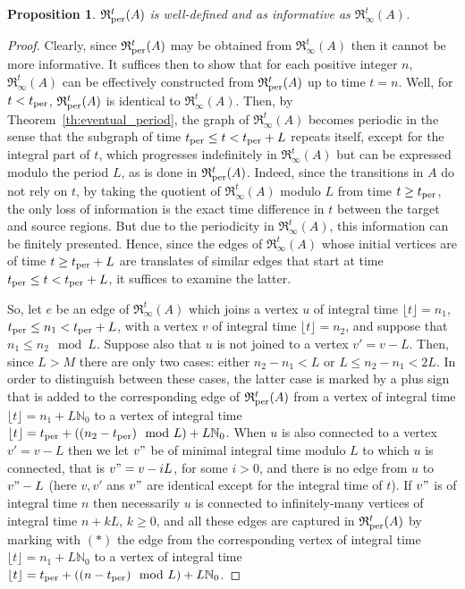 \documentclass[11pt]{amsart}
\newtheorem{proposition}[theorem]{Proposition}
\theoremstyle{definition}
\newcommand{\IARRR}{\mathfrak{R}_{\infty}^{t}}
\newcommand{\PARRR}{\mathfrak{R}_\textnormal{per}^{t}}
\newcommand{\ZNaturals}{\mathbb{N}_0}
\begin{document}
\begin{proposition}
	\label{prop:well_def}
	$\PARRR(A)$ is well-defined and as informative as $\IARRR(A)$.
\end{proposition}
\begin{proof}
	Clearly, since $\PARRR(A)$ may be obtained from $\IARRR(A)$ then it cannot be more informative.
	It suffices then to show that for each positive integer $n$, $\IARRR(A)$ can be effectively constructed from $\PARRR(A)$ up to time $t=n$.
	Well, for $t < t_\textnormal{per}$, $\PARRR(A)$ is identical to $\IARRR(A)$.
	Then, by Theorem~\ref{th:eventual_period}, the graph of $\IARRR(A)$ becomes periodic in the sense that the subgraph of time $t_\textnormal{per} \leq t < t_\textnormal{per} + L$ repeats itself, except for the integral part of $t$, which progresses indefinitely in $\IARRR(A)$ but can be expressed modulo the period $L$, as is done in $\PARRR(A)$.
	Indeed, since the transitions in $A$ do not rely on $t$, by taking the quotient of $\IARRR(A)$ modulo $L$ from time $t \geq t_\textnormal{per}$, the only loss of information is the exact time difference in $t$ between the target and source regions.
	But due to the periodicity in $\IARRR(A)$, this information can be finitely presented.
	Hence, since the edges of $\IARRR(A)$ whose initial vertices are of time $t \geq t_\textnormal{per} + L$ are translates of similar edges that start at time $t_\textnormal{per} \leq t < t_\textnormal{per} + L$, it suffices to examine the latter.
		
	So, let $e$ be an edge of $\IARRR(A)$ which joins a vertex $u$ of integral time $\lfloor t \rfloor = n_1$, $t_\textnormal{per} \leq n_1 < t_\textnormal{per} + L$, with a vertex $v$ of integral time 
	$\lfloor t \rfloor = n_2$, and suppose that $n_1 \leq n_2 \mod L$.
	Suppose also that $u$ is not joined to a vertex $v' = v-L$. 
	Then, since $L > M$ there are only two cases: either $n_2 - n_1 < L$ or $L \leq n_2 - n_1 < 2L$.
	In order to distinguish between these cases, the latter case is marked by a plus sign that is added to the corresponding edge of $\PARRR(A)$ from a vertex of integral time $\lfloor t \rfloor = n_1 + L\ZNaturals$ to a vertex of integral time $\lfloor t \rfloor = t_\textnormal{per} + ((n_2 - t_\textnormal{per}) \mod L) + L\ZNaturals$.
	When $u$ is also connected to a vertex $v' = v-L$ then we let $v"$ be of minimal integral time modulo $L$ to which $u$ is connected, that is $v" = v-iL$, for some $i > 0$, and there is no edge from $u$ to $v" - L$ (here $v, v'$ ans $v"$ are identical except for the integral time of $t$).
	If $v"$ is of integral time $n$ then necessarily $u$ is connected to infinitely-many vertices of integral time $n + kL$, $k \geq 0$, and all these edges are captured in $\PARRR(A)$ by marking with $(*)$ the edge from the corresponding vertex of integral time $\lfloor t \rfloor = n_1 + L\ZNaturals$ to a vertex of integral time $\lfloor t \rfloor = t_\textnormal{per} +((n - t_\textnormal{per}) \mod L) + L\ZNaturals$. 
	

\end{proof}
\end{document}
